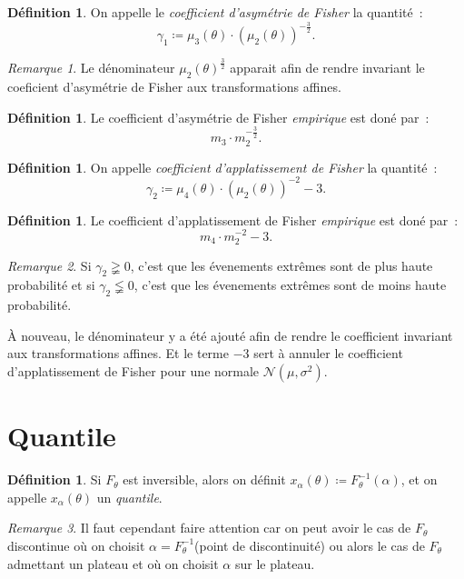 \documentclass{report}
\newcommand{\Nms}{\mathcal N(\mu, \sigma^2)}
\theoremstyle{definition}
\newtheorem{déf}[thm]{Définition}
\theoremstyle{remark}
\newtheorem*{rmq}{Remarque}
\begin{document}
			\begin{déf} On appelle le \textit{coefficient d'asymétrie de Fisher} la quantité~:
			\[\gamma_1 \coloneqq \mu_3(\theta) \cdot \left(\mu_2(\theta)\right)^{-\frac 32}.\]
			\end{déf}

			\begin{rmq} Le dénominateur $\mu_2(\theta)^{\frac 32}$ apparait afin de rendre invariant le coeficient d'asymétrie de Fisher aux transformations
			affines. \end{rmq}

			\begin{déf} Le coefficient d'asymétrie de Fisher \textit{empirique} est doné par~:
			\[m_3 \cdot m_2^{-\frac 32}.\]
			\end{déf}

			\begin{déf} On appelle \textit{coefficient d'applatissement de Fisher} la quantité~:
			\[\gamma_2 \coloneqq \mu_4(\theta) \cdot \left(\mu_2(\theta)\right)^{-2} - 3.\]
			\end{déf}

			\begin{déf} Le coefficient d'applatissement de Fisher \textit{empirique} est doné par~:
			\[m_4 \cdot m_2^{-2} - 3.\]
			\end{déf}

			\begin{rmq} Si $\gamma_2 \gneqq 0$, c'est que les évenements extrêmes sont de plus haute probabilité et si $\gamma_2 \lneqq 0$, c'est que les
			évenements extrêmes sont de moins haute probabilité.

			À nouveau, le dénominateur y a été ajouté afin de rendre le coefficient invariant aux transformations affines. Et le terme $-3$ sert à annuler le
			coefficient d'applatissement de Fisher pour une normale $\Nms$. \end{rmq}

	\section{Quantile}
		\begin{déf} Si $F_\theta$ est inversible, alors on définit $x_\alpha(\theta) \coloneqq F_\theta^{-1}(\alpha)$, et on appelle $x_\alpha(\theta)$ un
		\textit{quantile}. \end{déf}

		\begin{rmq} Il faut cependant faire attention car on peut avoir le cas de $F_\theta$ discontinue où on choisit $\alpha = F_\theta^{-1}$(point de discontinuité)
		ou alors le cas de $F_\theta$ admettant un plateau et où on choisit $\alpha$ sur le plateau. \end{rmq}
\end{document}
